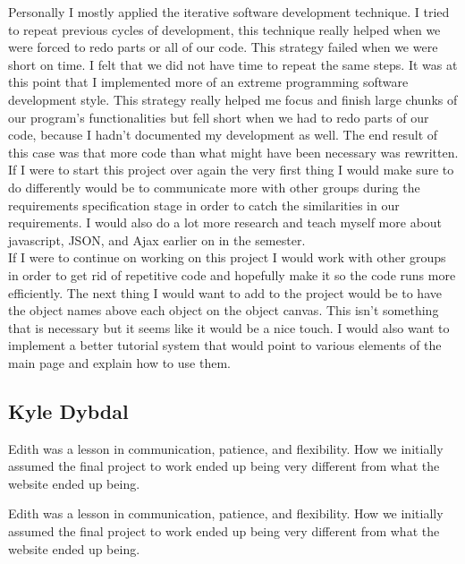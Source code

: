 \documentclass[12pt]{article}
\begin{document}
Personally I mostly applied the iterative software development technique. I tried to repeat previous cycles of development, this technique really helped when we were forced to redo parts or all of our code. This strategy failed when we were short on time. I felt that we did not have time to repeat the same steps. It was at this point that I implemented more of an extreme programming software development style. This strategy really helped me focus and finish large chunks of our program's functionalities but fell short when we had to redo parts of our code, because I hadn't documented my development as well. The end result of this case was that more code than what might have been necessary was rewritten. \\
If I were to start this project over again the very first thing I would make sure to do differently would be to communicate more with other groups during the requirements specification stage in order to catch the similarities in our requirements. I would also do a lot more research and teach myself more about javascript, JSON, and Ajax earlier on in the semester. \\
If I were to continue on working on this project I would work with other groups in order to get rid of repetitive code and hopefully make it so the code runs more efficiently. The next thing I would want to add to the project would be to have the object names above each object on the object canvas. This isn't something that is necessary but it seems like it would be a nice touch. I would also want to implement a better tutorial system that would point to various elements of the main page and explain how to use them.

\subsection{Kyle Dybdal}

Edith was a lesson in communication, patience, and flexibility. How we initially assumed the final project to work ended up being very different from what the website ended up being. 

Edith was a lesson in communication, patience, and flexibility. How we initially assumed the final project to work ended up being very different from what the website ended up being.\\
\end{document}
